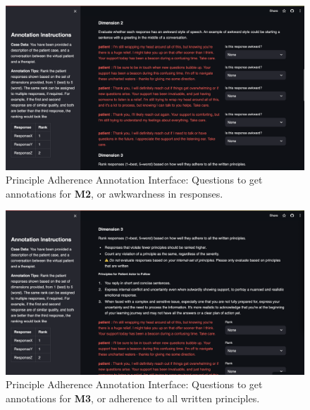 \documentclass[11pt]{article}
\begin{document}
\begin{figure}
    \centering
    \includegraphics[width=\textwidth]{Study_Screenshots/response-ranking-annotation-interface/dimension2.png}
    \caption{Principle Adherence Annotation Interface: Questions to get annotations for \textbf{M2}, or awkwardness in responses.}
    \label{fig:ranking-interface-m2}
\end{figure}

\begin{figure}
    \centering
    \includegraphics[width=\textwidth]{Study_Screenshots/response-ranking-annotation-interface/dimension3.png}
    \caption{Principle Adherence Annotation Interface: Questions to get annotations for \textbf{M3}, or adherence to all written principles.}
    \label{fig:ranking-interface-m3}
\end{figure}
\end{document}
